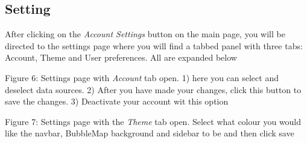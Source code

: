 \documentclass[hidelinks,english]{article}
\begin{document}
	\subsection{Setting}
	    After clicking on the \textit{Account Settings} button on the main page, you will be directed to the settings page where you will find a tabbed panel with three tabs: Account, Theme and User preferences. All are expanded below
	 \begin{center}
	  \caption{Figure 6: Settings page with \textit{Account} tab open. 1) here you can select and deselect data sources. 2) After you have made your changes, click this button to save the changes. 3) Deactivate your account wit this option }
	  \label{mobile page}
	\end{center}
	\begin{center}
	  \caption{Figure 7: Settings page with the \textit{Theme} tab open. Select what colour you would like the navbar, BubbleMap background and sidebar to be and then click save}
	  \label{mobile page}
	\end{center}
\end{document}

